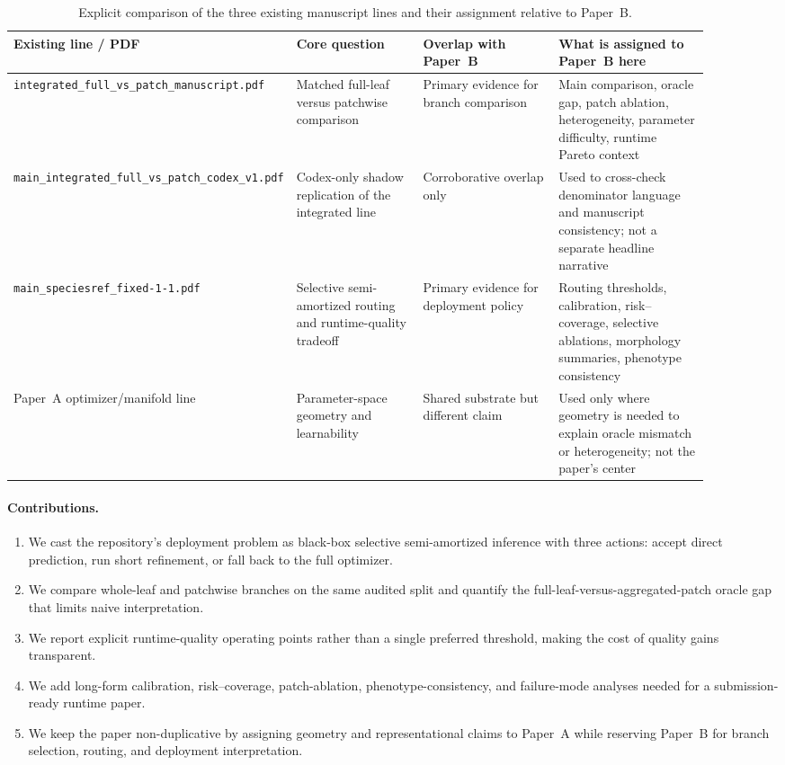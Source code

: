 \documentclass[11pt,a4paper]{article}
\begin{document}
\begin{table}[H]
\centering
\caption{Explicit comparison of the three existing manuscript lines and their assignment relative to Paper~B.}
\label{tab:lineageB}
\small
\begin{tabular}{p{0.22\linewidth}p{0.21\linewidth}p{0.22\linewidth}p{0.25\linewidth}}
\toprule
Existing line / PDF & Core question & Overlap with Paper~B & What is assigned to Paper~B here \\
\midrule
\texttt{integrated\_full\_vs\_patch\_manuscript.pdf} & Matched full-leaf versus patchwise comparison & Primary evidence for branch comparison & Main comparison, oracle gap, patch ablation, heterogeneity, parameter difficulty, runtime Pareto context \\
\texttt{main\_integrated\_full\_vs\_patch\_codex\_v1.pdf} & Codex-only shadow replication of the integrated line & Corroborative overlap only & Used to cross-check denominator language and manuscript consistency; not a separate headline narrative \\
\texttt{main\_speciesref\_fixed-1-1.pdf} & Selective semi-amortized routing and runtime-quality tradeoff & Primary evidence for deployment policy & Routing thresholds, calibration, risk--coverage, selective ablations, morphology summaries, phenotype consistency \\
Paper~A optimizer/manifold line & Parameter-space geometry and learnability & Shared substrate but different claim & Used only where geometry is needed to explain oracle mismatch or heterogeneity; not the paper's center \\
\bottomrule
\end{tabular}
\end{table}

\paragraph{Contributions.}
\begin{enumerate}[leftmargin=1.5em,itemsep=2pt]
\item We cast the repository's deployment problem as black-box selective semi-amortized inference with three actions: accept direct prediction, run short refinement, or fall back to the full optimizer.
\item We compare whole-leaf and patchwise branches on the same audited split and quantify the full-leaf-versus-aggregated-patch oracle gap that limits naive interpretation.
\item We report explicit runtime-quality operating points rather than a single preferred threshold, making the cost of quality gains transparent.
\item We add long-form calibration, risk--coverage, patch-ablation, phenotype-consistency, and failure-mode analyses needed for a submission-ready runtime paper.
\item We keep the paper non-duplicative by assigning geometry and representational claims to Paper~A while reserving Paper~B for branch selection, routing, and deployment interpretation.
\end{enumerate}
\end{document}
